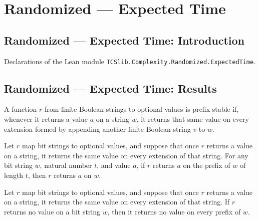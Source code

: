 \section{Randomized --- Expected Time}
\subsection*{Randomized --- Expected Time: Introduction}

Declarations of the Lean module \texttt{TCSlib.Complexity.Randomized.ExpectedTime}.

\subsection*{Randomized --- Expected Time: Results}

\begin{definition}
\label{Randomized.IsPrefixStable}
\leanok
A function $r$ from finite Boolean strings to optional values is prefix stable if,
whenever it returns a value $a$ on a string $w$, it returns that same value on every
extension formed by appending another finite Boolean string $v$ to $w$.
\end{definition}

\begin{theorem}
\label{Randomized.IsPrefixStable.of_take}
\leanok
{}
Let $r$ map bit strings to optional values, and suppose that once $r$ returns a value on
a string, it returns the same value on every extension of that string. For any bit
string $w$, natural number $t$, and value $a$, if $r$ returns $a$ on the prefix of $w$
of length $t$, then $r$ returns $a$ on $w$.
\end{theorem}

\begin{theorem}
\label{Randomized.IsPrefixStable.take_eq_none}
\leanok
{}
Let $r$ map bit strings to optional values, and suppose that once $r$ returns a value on
a string, it returns the same value on every extension of that string. If $r$ returns no
value on a bit string $w$, then it returns no value on every prefix of $w$.
\end{theorem}

